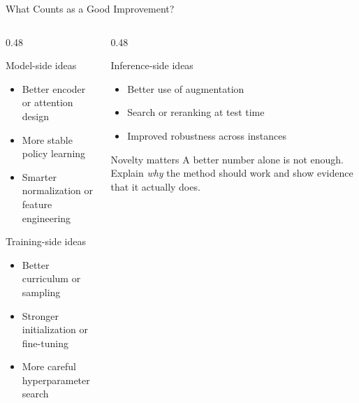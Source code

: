 \documentclass[aspectratio=169,11pt]{beamer}
\begin{document}
\begin{frame}{What Counts as a Good Improvement?}
  \begin{columns}[T,totalwidth=\textwidth]
    \begin{column}{0.48\textwidth}
      \begin{block}{Model-side ideas}
        \begin{itemize}
          \item Better encoder or attention design
          \item More stable policy learning
          \item Smarter normalization or feature engineering
        \end{itemize}
      \end{block}
      \begin{block}{Training-side ideas}
        \begin{itemize}
          \item Better curriculum or sampling
          \item Stronger initialization or fine-tuning
          \item More careful hyperparameter search
        \end{itemize}
      \end{block}
    \end{column}
    \begin{column}{0.48\textwidth}
      \begin{block}{Inference-side ideas}
        \begin{itemize}
          \item Better use of augmentation
          \item Search or reranking at test time
          \item Improved robustness across instances
        \end{itemize}
      \end{block}
      \begin{alertblock}{Novelty matters}
        A better number alone is not enough. Explain \emph{why} the method should work and show evidence that it actually does.
      \end{alertblock}
    \end{column}
  \end{columns}
\end{frame}
\end{document}

